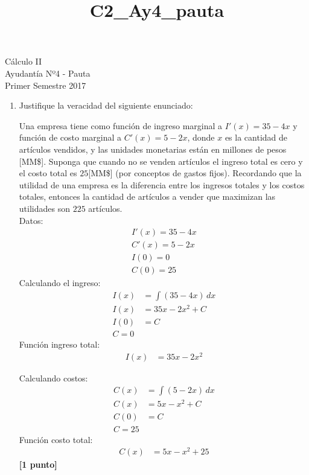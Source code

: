\documentclass[a4paper,10pt]{article}
\title{C2_Ay4_pauta}
\newcommand{\dis}{\displaystyle}
\begin{document}
\begin{center}
Cálculo II\\
Ayudantía Nº4 - Pauta\\
Primer Semestre 2017
\end{center}



\begin{enumerate}
\item Justifique la veracidad del siguiente enunciado:

Una empresa tiene como función de ingreso marginal a $I'(x)=35-4x$ y función de costo marginal a $C'(x) = 5-2x$, donde $x$ es la cantidad de artículos vendidos, y las unidades monetarias están en millones de pesos [MM\$]. Suponga que cuando no se venden artículos el ingreso total es cero y el costo total es $25$[MM\$] (por conceptos de gastos fijos). Recordando que la utilidad de una empresa es la diferencia entre los ingresos totales y los costos totales, entonces la cantidad de artículos a vender que maximizan las utilidades son $225$ artículos. \\

Datos:
\begin{align*}
 \dis  I'(x)=35-4x \\
 \dis  C'(x) = 5-2x \\
 \dis I(0) = 0\\
 \dis C(0) = 25
\end{align*}
Calculando el ingreso:
\begin{align*}
 \dis  I(x)  &=  \dis  \int (35-4x) \, dx  \\
 \dis  I(x) &=  \dis  35x - 2x^2 + C  \\
 \dis  I(0) &=  C  \\
 \dis  C = 0
\end{align*}
Función ingreso total:
\begin{align*}
 \dis  I(x)  &=  \dis  35x - 2x^2
\end{align*}

Calculando costos:
\begin{align*}
 \dis  C(x)  &=  \dis  \int (5-2x) \, dx  \\
 \dis  C(x) &=  \dis  5x - x^2 + C  \\
 \dis  C(0) &=  C  \\
 \dis  C = 25
\end{align*}
Función costo total:
\begin{align*}
 \dis  C(x)  &=  \dis  5x - x^2 + 25
\end{align*}
\dotfill\textbf{[1 punto]}


\end{enumerate}
\end{document}
